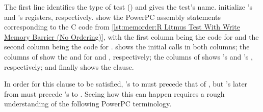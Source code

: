 \begin{fcvref}
The first line identifies the type of test () and gives
the test's name.
 initialize 's and 's registers,
respectively.
 show the PowerPC assembly
statements corresponding to the C code from
\cref{lst:memorder:R Litmus Test With Write Memory Barrier (No Ordering)},
with the first column being the code for  and the second column
being the code for .
 shows the initial  calls in both columns;
the columns of  show the  and 
for  and , respectively;
the columns of  shows 's  and
's , respectively;
and finally  shows the  clause.
\end{fcvref}

In order for this  clause to be satisfied, 's
 to  must precede that of , but 's
later  from  must precede 's  to .
Seeing how this can happen requires a rough understanding of the
following PowerPC terminology.

